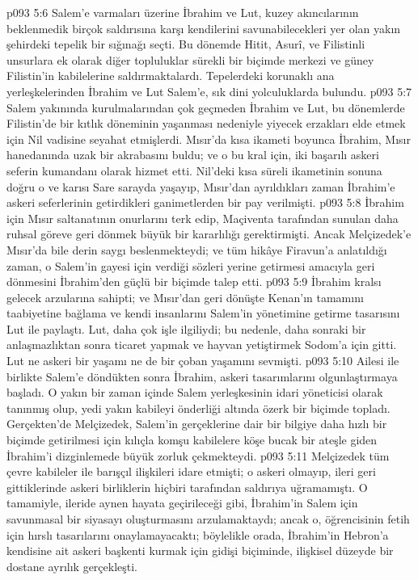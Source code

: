 \vs p093 5:6 Salem’e varmaları üzerine İbrahim ve Lut, kuzey akıncılarının beklenmedik birçok saldırısına karşı kendilerini savunabilecekleri yer olan yakın şehirdeki tepelik bir sığınağı seçti. Bu dönemde Hitit, Asurî, ve Filistinli unsurlara ek olarak diğer topluluklar sürekli bir biçimde merkezi ve güney Filistin’in kabilelerine saldırmaktalardı. Tepelerdeki korunaklı ana yerleşkelerinden İbrahim ve Lut Salem’e, sık dini yolculuklarda bulundu.
\vs p093 5:7 Salem yakınında kurulmalarından çok geçmeden İbrahim ve Lut, bu dönemlerde Filistin’de bir kıtlık döneminin yaşanması nedeniyle yiyecek erzakları elde etmek için Nil vadisine seyahat etmişlerdi. Mısır’da kısa ikameti boyunca İbrahim, Mısır hanedanında uzak bir akrabasını buldu; ve o bu kral için, iki başarılı askeri seferin kumandanı olarak hizmet etti. Nil’deki kısa süreli ikametinin sonuna doğru o ve karısı Sare sarayda yaşayıp, Mısır’dan ayrıldıkları zaman İbrahim’e askeri seferlerinin getirdikleri ganimetlerden bir pay verilmişti.
\vs p093 5:8 İbrahim için Mısır saltanatının onurlarını terk edip, Maçiventa tarafından sunulan daha ruhsal göreve geri dönmek büyük bir kararlılığı gerektirmişti. Ancak Melçizedek’e Mısır’da bile derin saygı beslenmekteydi; ve tüm hikâye Firavun’a anlatıldığı zaman, o Salem’in gayesi için verdiği sözleri yerine getirmesi amacıyla geri dönmesini İbrahim’den güçlü bir biçimde talep etti.
\vs p093 5:9 İbrahim kralsı gelecek arzularına sahipti; ve Mısır’dan geri dönüşte Kenan’ın tamamını taabiyetine bağlama ve kendi insanlarını Salem’in yönetimine getirme tasarısını Lut ile paylaştı. Lut, daha çok işle ilgiliydi; bu nedenle, daha sonraki bir anlaşmazlıktan sonra ticaret yapmak ve hayvan yetiştirmek Sodom’a için gitti. Lut ne askeri bir yaşamı ne de bir çoban yaşamını sevmişti.
\vs p093 5:10 Ailesi ile birlikte Salem’e döndükten sonra İbrahim, askeri tasarımlarını olgunlaştırmaya başladı. O yakın bir zaman içinde Salem yerleşkesinin idari yöneticisi olarak tanınmış olup, yedi yakın kabileyi önderliği altında özerk bir biçimde topladı. Gerçekten’de Melçizedek, Salem’in gerçeklerine dair bir bilgiye daha hızlı bir biçimde getirilmesi için kılıçla komşu kabilelere köşe bucak bir ateşle giden İbrahim’i dizginlemede büyük zorluk çekmekteydi.
\vs p093 5:11 Melçizedek tüm çevre kabileler ile barışçıl ilişkileri idare etmişti; o askeri olmayıp, ileri geri gittiklerinde askeri birliklerin hiçbiri tarafından saldırıya uğramamıştı. O tamamiyle, ileride aynen hayata geçirileceği gibi, İbrahim’in Salem için savunmasal bir siyasayı oluşturmasını arzulamaktaydı; ancak o, öğrencisinin fetih için hırslı tasarılarını onaylamayacaktı; böylelikle orada, İbrahim’in Hebron’a kendisine ait askeri başkenti kurmak için gidişi biçiminde, ilişkisel düzeyde bir dostane ayrılık gerçekleşti.
